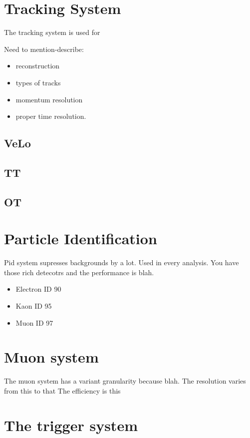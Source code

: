 \section{Tracking System}
The tracking system is used for

Need to mention-describe:
\begin{itemize}
  \item reconstruction
  \item types of tracks
  \item momentum resolution
  \item proper time resolution.
\end{itemize}

\subsection{VeLo}
\subsection{TT}
\subsection{OT}

\section{Particle Identification}
Pid system supresses backgrounds by a lot.
Used in every analysis.
You have those rich detecotrs and the performance is blah.

\begin{itemize}
  \item Electron ID  90 %
  \item Kaon ID 95 %
  \item Muon ID 97 %
\end{itemize}


\section{Muon system}
The muon system has a variant granularity because blah.
The resolution varies from this to that
The efficiency is this

\section{The trigger system}
\label{lhcb_trigger}

